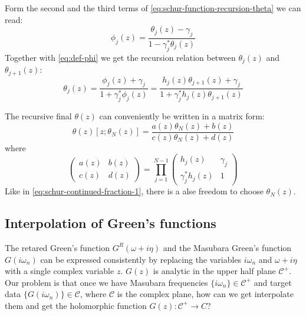 \documentclass[
	preprint,%
	aps,
	prb,
	showpacs,	
	amsmath, amssymb]{revtex4-2}
\DeclareRobustCommand{\+}{\hstretch{1.25} {\boldsymbol {\mathrel{+}}}}
\newcommand{\C}{ {\mathcal{C}} }
\begin{document}
Form the second and the third terms of \cref{eq:schur-function-recursion-theta}
we can read:
\begin{equation}\label{eq:phi-theta-j}
	\phi_j(z)
	= \frac{\theta_j(z) - \gamma_j}{1 - \gamma_j^* \theta_j(z)}
\end{equation}
Together with \cref{eq:def-phi} we get the recursion relation between 
$\theta_j(z)$ and $\theta_{j+1}(z)$:
\begin{equation}\label{eq:recursion-relation-theta}
	\theta_j(z) = \frac{\phi_j(z) + \gamma_j}{1 + \gamma_j^*\phi_j(z)}
		= \frac{h_j(z) \theta_{j+1}(z)  + \gamma_j}
			{1 + \gamma_j^*h_j(z) \theta_{j+1}(z) }
\end{equation}

The recursive final $\theta(z)$ can conveniently be written in a
matrix form:
\begin{equation}\label{eq:recursive-theta}
	\theta(z)[z;\theta_N(z)] 
		= \frac{a(z)\theta_N(z) + b(z)}{c(z)\theta_N(z) + d(z)}
\end{equation}
where
\begin{equation}\label{eq:factor-matrix}
	\left(
		\begin{matrix}
			a(z) & b(z) \\
			c(z) & d(z)
		\end{matrix}
	\right) = \prod_{j=1}^{N-1}
	\left(
		\begin{matrix}
			h_j(z)            & \gamma_j \\
			\gamma_j^* h_j(z) & 1
		\end{matrix}
	\right)
\end{equation}
Like in \cref{eq:schur-continued-fraction-1}, 
there is a alse freedom to choose $\theta_N(z)$.


\subsection{Interpolation of Green's functions}
\label{subsec:interpolation-of-GF}

The retared Green's function $G^R(\omega + i\eta)$ and the Masubara 
Green's function $G(i\omega_n)$ can be expressed consistently by replacing 
the variables $i\omega_n$ and $\omega + i\eta$ with a single complex 
variable $z$. $G(z)$ is analytic in the upper half plane $\C^+$. 
Our problem is that once we have Masubara frequencies $\{i\omega_n\} \in \C^+$ 
and target data $\{ G(i\omega_n)\} \in \C$, where $\C$ is 
the complex plane, how can we get interpolate them and get the 
holomorphic function $G(z):\C^+ \to C$?
\end{document}
